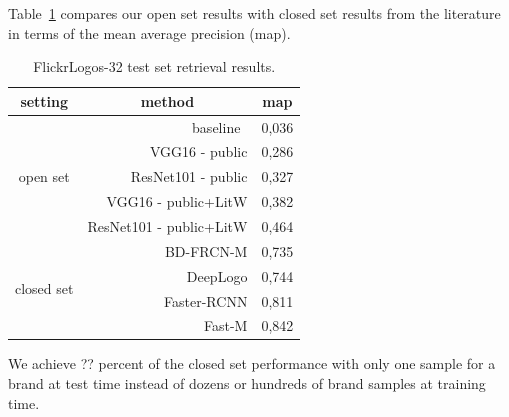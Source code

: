 \documentclass[a4paper,twoside]{article}
\begin{document}
Table~\ref{tab:map} compares our open set results with closed set results from the literature in terms of the mean average precision (map). 
%
\begin{table}[t]
\centering
\begingroup	
\setlength{\tabcolsep}{6pt}
\caption{FlickrLogos-32 test set retrieval results.}
\label{tab:map}
\begin{small}
\begin{tabular}{crc}
\textbf{setting} & \multicolumn{1}{c}{\textbf{method}} & \textbf{map} \bigstrut[b]\\
\hline
\multirow{5}[2]{*}{\begin{sideways}open set\end{sideways}} & baseline~\cite{??} & 0,036 \bigstrut[t]\\
      & VGG16 - public & 0,286 \\
      & ResNet101 - public & 0,327 \\
\cline{2-3}      
      & VGG16 - public+LitW & 0,382 \bigstrut[t]\\
      & ResNet101 - public+LitW & 0,464 \bigstrut[b]\\
\hline
\multirow{4}[1]{*}{\begin{sideways}closed set\end{sideways}} & BD-FRCN-M \cite{oliveira2016} & 0,735 \bigstrut[t]\\	
      & DeepLogo \cite{iandola2015} & 0,744 \\ %
      & Faster-RCNN \cite{su2016} & 0,811 \\
      & Fast-M \cite{bao2016} & 0,842 \\
\end{tabular}%
\end{small}
\endgroup
\end{table}
We achieve ?? percent of the closed set performance with only one sample for a brand at test time instead of dozens or hundreds of brand samples at training time.
\end{document}
